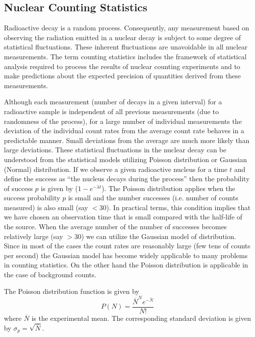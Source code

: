 \documentclass[%
 reprint,
nofootinbib,
 amsmath,amssymb,
 aps,
floatfix,
]{revtex4-2}
\begin{document}
    \subsection{Nuclear Counting Statistics}
        Radioactive decay is a random process. Consequently, any measurement based on observing the radiation emitted in a nuclear decay is subject to some degree of statistical fluctuations. These inherent fluctuations are unavoidable in all nuclear measurements. The term counting statistics includes the framework of statistical analysis required to process the results of nuclear counting experiments and to make predictions about the expected precision of quantities derived from these measurements.
        \par
        Although each measurement (number of decays in a given interval) for a radioactive sample is independent of all previous measurements (due to randomness of the process), for a large number of individual measurements the deviation of the individual count rates from the average count rate behaves in a predictable manner. Small deviations from the average are much more likely than large deviations. These statistical fluctuations in the nuclear decay can be understood from the statistical models utilizing Poisson distribution or Gaussian (Normal) distribution. If we observe a given radioactive nucleus for a time $t$ and define the success as ``the nucleus decays during the process'' then the probability of success $p$ is given by ($1-e^{-\lambda t}$). The Poisson distribution applies when the success probability $p$ is small and the number successes (i.e. number of counts measured) is also small (say $<30$). In practical terms, this condition implies that we have chosen an observation time that is small compared with the half-life of the source. When the average number of the number of successes becomes relatively large (say $> 30$) we can utilize the Gaussian model of distribution. Since in most of the cases the count rates are reasonably large (few tens of counts per second) the Gaussian model has become widely applicable to many problems in counting statistics. On the other hand the Poisson distribution is applicable in the case of background counts.
        \par
        The Poisson distribution function is given by
        \begin{equation}
            P(N) = \dfrac{\overline{N}^N e^{-\overline{N}}}{N!}
        \end{equation}
        where $\overline{N}$ is the experimental mean. The corresponding standard deviation is given by $\sigma_p = \sqrt{\overline{N}}$. 
\end{document}
